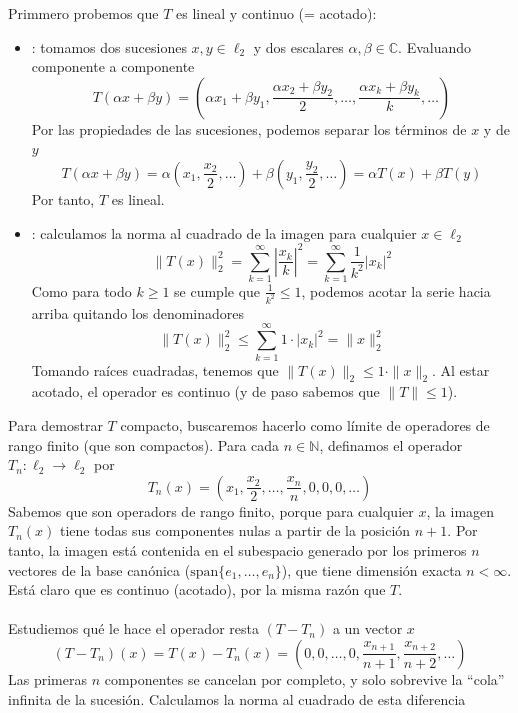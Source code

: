 \begin{ejercicio}
    \noindent
    Primmero probemos que $T$ es lineal y continuo (= acotado):
    \begin{itemize}
        \item {}: tomamos dos sucesiones $x, y \in \ell_2$ y dos escalares $\alpha, \beta \in \mathbb{C}$. Evaluando componente a componente
        $$T(\alpha x + \beta y) = \left( \alpha x_1 + \beta y_1, \frac{\alpha x_2 + \beta y_2}{2}, \dots, \frac{\alpha x_k + \beta y_k}{k}, \dots \right)$$
        Por las propiedades de las sucesiones, podemos separar los términos de $x$ y de $y$
        $$T(\alpha x+\beta y)= \alpha \left( x_1, \frac{x_2}{2}, \dots \right) + \beta \left( y_1, \frac{y_2}{2}, \dots \right) = \alpha T(x) + \beta T(y)$$
        Por tanto, $T$ es lineal.
        \item {}: calculamos la norma al cuadrado de la imagen para cualquier $x \in \ell_2$
        $$\|T(x)\|_2^2 = \sum_{k=1}^{\infty} \left| \frac{x_k}{k} \right|^2 = \sum_{k=1}^{\infty} \frac{1}{k^2} |x_k|^2$$
        Como para todo $k \ge 1$ se cumple que $\frac{1}{k^2} \le 1$, podemos acotar la serie hacia arriba quitando los denominadores
        $$\|T(x)\|_2^2 \le \sum_{k=1}^{\infty} 1 \cdot |x_k|^2 = \|x\|_2^2$$
        Tomando raíces cuadradas, tenemos que $\|T(x)\|_2 \le 1 \cdot \|x\|_2$. Al estar acotado, el operador es continuo (y de paso sabemos que $\|T\| \le 1$).
    \end{itemize}
    Para demostrar $T$ compacto, buscaremos hacerlo como límite de operadores de rango finito (que son compactos). Para cada $n \in \mathbb{N}$, definamos el operador $T_n: \ell_2 \longrightarrow \ell_2$ por
    $$T_n(x) = \left( x_1, \frac{x_2}{2}, \dots, \frac{x_n}{n}, 0, 0, 0, \dots \right)$$
    Sabemos que son operadors de rango finito, porque para cualquier $x$, la imagen $T_n(x)$ tiene todas sus componentes nulas a partir de la posición $n+1$. Por tanto, la imagen está contenida en el subespacio generado por los primeros $n$ vectores de la base canónica ($\text{span}\{e_1, \dots, e_n\}$), que tiene dimensión exacta $n < \infty$. Está claro que es continuo (acotado), por la misma razón que $T$. \\ \\
    \noindent
    Estudiemos qué le hace el operador resta $(T - T_n)$ a un vector $x$
    $$(T - T_n)(x) = T(x) - T_n(x) = \left( 0, 0, \dots, 0, \frac{x_{n+1}}{n+1}, \frac{x_{n+2}}{n+2}, \dots \right)$$
    Las primeras $n$ componentes se cancelan por completo, y solo sobrevive la ``cola'' infinita de la sucesión. Calculamos la norma al cuadrado de esta diferencia

\end{ejercicio}

